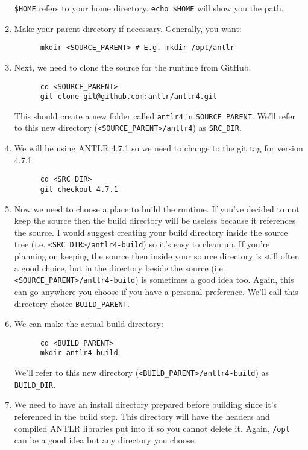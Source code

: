 \documentclass[../setup.tex]{subfiles}
\begin{document}
\begin{enumerate}
   \lstinline{$HOME} refers to your home directory. \lstinline{echo $HOME} will show you the path.
  \item
    Make your parent directory if necessary. Generally, you want:
    \begin{lstlisting}
      mkdir <SOURCE_PARENT> # E.g. mkdir /opt/antlr
    \end{lstlisting}
  \item
    Next, we need to clone the source for the runtime from GitHub.
    \begin{lstlisting}
      cd <SOURCE_PARENT>
      git clone git@github.com:antlr/antlr4.git
    \end{lstlisting}
    This should create a new folder called \lstinline{antlr4} in \lstinline{SOURCE_PARENT}. We'll
    refer to this new directory (\lstinline{<SOURCE_PARENT>/antlr4}) as \lstinline{SRC_DIR}.
  \item
    We will be using ANTLR 4.7.1 so we need to change to the git tag for version 4.7.1.
    \begin{lstlisting}
      cd <SRC_DIR>
      git checkout 4.7.1
    \end{lstlisting}
  \item
    Now we need to choose a place to build the runtime. If you've decided to not keep the source
    then the build directory will be useless because it references the source. I would suggest
    creating your build directory inside the source tree (i.e. \lstinline{<SRC_DIR>/antlr4-build})
    so it's easy to clean up. If you're planning on keeping the source then inside your source
    directory is still often a good choice, but in the directory beside the source (i.e.
    \lstinline{<SOURCE_PARENT>/antlr4-build}) is sometimes a good idea too. Again, this can go
    anywhere you choose if you have a personal preference. We'll call this directory choice
    \lstinline{BUILD_PARENT}.
  \item
    We can make the actual build directory:
    \begin{lstlisting}
      cd <BUILD_PARENT>
      mkdir antlr4-build
    \end{lstlisting}
    We'll refer to this new directory (\lstinline{<BUILD_PARENT>/antlr4-build}) as
    \lstinline{BUILD_DIR}.
  \item
    We need to have an install directory prepared before building since it's referenced in the
    build step. This directory will have the headers and compiled ANTLR libraries put into it so
    you cannot delete it. Again, \lstinline{/opt} can be a good idea but any directory you choose

\end{enumerate}
\end{document}
